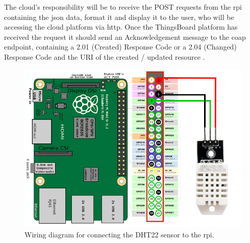 The cloud's responsibility will be to receive the POST requests from the 
\gls{rpi} containing the \gls{json} data, format it and display it 
to the user, who will be accessing the cloud platform via \gls{http}. 
Once the ThingsBoard platform has received the request it should send an 
Acknowledgement message to the \gls{coap} endpoint, 
containing a 2.01 (Created) Response Code or a 2.04 (Changed) Response Code 
and the URI of the created / updated resource \citep{shelby_constrained_2014}. 

\begin{figure}[H]
    \centering
   \includegraphics[width=\imageWidth\textwidth]{assets/rpi_wiring.png}
    \caption{\label{fig:rpi_wiring} Wiring diagram for connecting the DHT22 sensor to the \gls{rpi}.}
\end{figure}